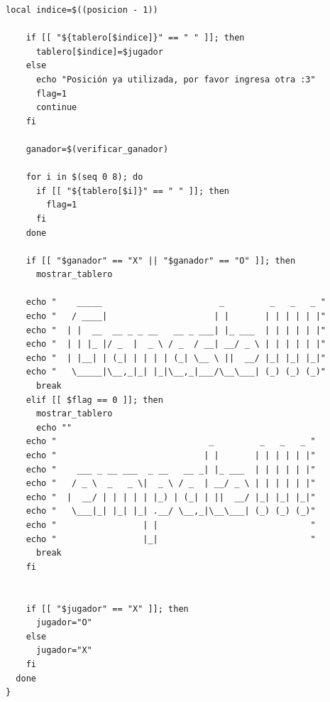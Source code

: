 \documentclass[12pt,a4paper]{article}
\begin{document}
\begin{lstlisting}[style=BashInputStyle]
    local indice=$((posicion - 1))

    if [[ "${tablero[$indice]}" == " " ]]; then
      tablero[$indice]=$jugador
    else
      echo "Posición ya utilizada, por favor ingresa otra :3"
      flag=1
      continue
    fi

    ganador=$(verificar_ganador)

    for i in $(seq 0 8); do
      if [[ "${tablero[$i]}" == " " ]]; then
        flag=1
      fi
    done

    if [[ "$ganador" == "X" || "$ganador" == "O" ]]; then
      mostrar_tablero

	echo "    _____                       _         _   _   _ "
	echo "   / ____|                     | |       | | | | | |"
	echo "  | |  __  __ _ _ __   __ _ ___| |_ ___  | | | | | |"
	echo "  | | |_ |/ _  |  _ \ / _  / __| __/ _ \ | | | | | |"
	echo "  | |__| | (_| | | | | (_| \__ \ ||  __/ |_| |_| |_|"
	echo "   \_____|\__,_|_| |_|\__,_|___/\__\___| (_) (_) (_)"
      break
    elif [[ $flag == 0 ]]; then
      mostrar_tablero
      echo ""
	echo "                              _         _   _   _ "
	echo "                             | |       | | | | | |"
	echo "    ___ _ __ ___  _ __   __ _| |_ ___  | | | | | |"
	echo "   / _ \  _   _ \|  _ \ / _  | __/ _ \ | | | | | |"
	echo "  |  __/ | | | | | |_) | (_| | ||  __/ |_| |_| |_|"
	echo "   \___|_| |_| |_| .__/ \__,_|\__\___| (_) (_) (_)"
	echo "                 | |                              "
	echo "                 |_|                              "
      break
    fi

 
    if [[ "$jugador" == "X" ]]; then
      jugador="O"
    else
      jugador="X"
    fi
  done
}



\end{lstlisting}
\end{document}

